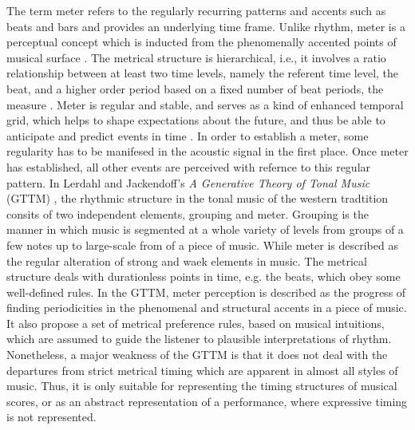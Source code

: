 \documentclass{scrartcl}
\begin{document}
The term meter refers to the regularly recurring patterns and accents such as beats and bars and provides an underlying time frame. Unlike rhythm, meter is a perceptual concept which is inducted from the phenomenally accented points of musical surface \cite{London2004}. The metrical structure is hierarchical, i.e., it involves a ratio relationship between at least two time levels, namely the referent time level, the beat, and a higher order period based on a fixed number of beat periods, the measure \cite{Yeston1976}. Meter is regular and stable, and serves as a kind of enhanced temporal grid, which helps to shape expectations about the future, and thus be able to anticipate and predict events in time \cite{Huron2006}. In order to establish a meter, some regularity has to be manifesed in the acoustic signal in the first place. Once meter has established, all other events are perceived with refernce to this regular pattern.  In Lerdahl and Jackendoff's \emph{A Generative Theory of Tonal Music} (GTTM) \cite{Lerdahl1985}, the rhythmic structure in the tonal music of the western tradtition consits of two independent elements, grouping and meter. Grouping is the manner in which music is segmented at a whole variety of levels from groups of a few notes up to large-scale from of a piece of music. While meter is described as the regular alteration of strong and waek elements in music. The metrical structure deals with durationless points in time, e.g. the beats, which obey some well-defined rules. In the GTTM, meter perception is described as the progress of finding periodicities in the phenomenal and structural accents in a piece of music. It also propose a set of metrical preference rules, based on musical intuitions, which are assumed to guide the listener to plausible interpretations of rhythm. Nonetheless, a major weakness of the GTTM is that it does not deal with the departures from strict metrical timing which are apparent in almost all styles of music. Thus, it is only suitable for representing the timing structures of musical scores, or as an abstract representation of a performance, where expressive timing is not represented.



\end{document}
